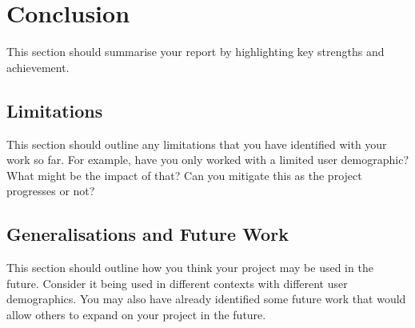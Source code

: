 \section{Conclusion}
This section should summarise your report by highlighting key strengths and achievement. 

\subsection{Limitations}
This section should outline any limitations that you have identified with your work so far. For example, have you only worked with a limited user demographic? What might be the impact of that? Can you mitigate this as the project progresses or not?


\subsection{Generalisations and Future Work}
This section should outline how you think your project may be used in the future. Consider it being used in different contexts with different user demographics. You may also have already identified some future work that would allow others to expand on your project in the future. 
